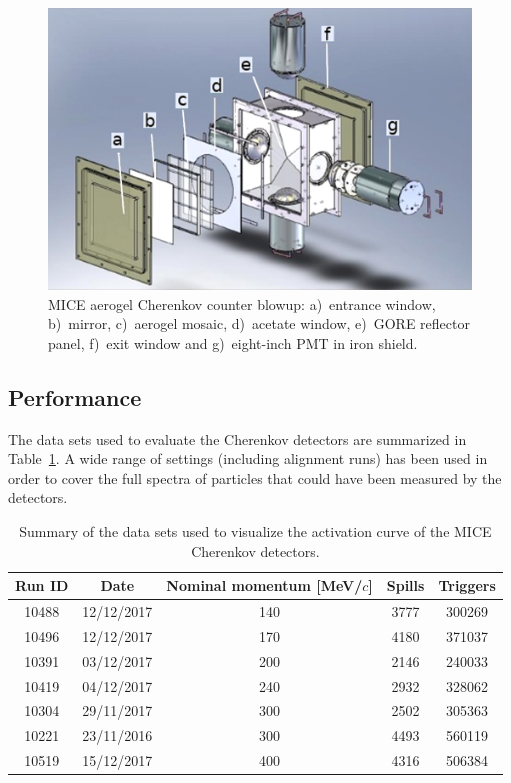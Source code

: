 \begin{figure}[htb!]
  \begin{center}
    \includegraphics[width=0.6\columnwidth]{./03-Ckov/Figures/Ckov_fix.png}
    \caption{MICE aerogel Cherenkov counter blowup: a)~entrance window, b)~mirror, c)~aerogel mosaic, d)~acetate window, e)~GORE reflector panel, f)~exit window and g)~eight-inch PMT in iron shield.}
    \label{fig:ckov1}
  \end{center}
\end{figure}

\subsection{Performance}
\label{SubSect:Ckov_Performance}

The data sets used to evaluate the Cherenkov detectors are summarized in Table~\ref{tab:ckov}. A wide range of settings (including alignment runs) has been used in order to cover the full spectra of particles that could have been measured by the detectors.

\begin{table}
  \begin{center}
    \begin{tabular}{c|c|c|c|c}
       Run ID & Date & Nominal momentum [MeV/$c$] & Spills & Triggers \\
  		\hline
       10488  & 12/12/2017 & 140 & 3777 & 300269 \\
       10496  & 12/12/2017 & 170 & 4180 & 371037 \\
       10391  & 03/12/2017 & 200 & 2146 & 240033 \\
       10419  & 04/12/2017 & 240 & 2932 & 328062 \\
       10304  & 29/11/2017 & 300 & 2502 & 305363 \\
       10221  & 23/11/2016 & 300 & 4493 & 560119 \\
       10519  & 15/12/2017 & 400 & 4316 & 506384 \\
    \end{tabular}
   \caption{Summary of the data sets used to visualize the activation curve of the MICE Cherenkov detectors.}
   \label{tab:ckov}
  \end{center}
\end{table}

